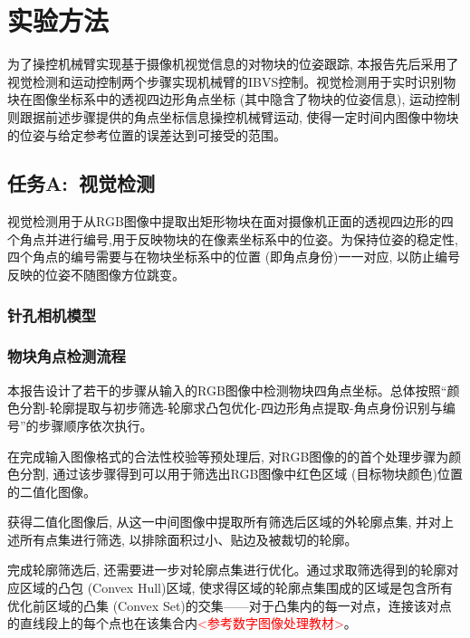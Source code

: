 
\chapter{实验方法}
\label{cha:Chapter2}
为了操控机械臂实现基于摄像机视觉信息的对物块的位姿跟踪, 本报告先后采用了视觉检测和运动控制两个步骤实现机械臂的IBVS控制。视觉检测用于实时识别物块在图像坐标系中的透视四边形角点坐标 (其中隐含了物块的位姿信息), 运动控制则跟据前述步骤提供的角点坐标信息操控机械臂运动, 使得一定时间内图像中物块的位姿与给定参考位置的误差达到可接受的范围。

\section{任务A:\ 视觉检测}
\label{sec:2_FeatureDetection}

视觉检测用于从RGB图像中提取出矩形物块在面对摄像机正面的透视四边形的四个角点并进行编号,用于反映物块的在像素坐标系中的位姿。为保持位姿的稳定性, 四个角点的编号需要与在物块坐标系中的位置 (即角点身份)一一对应, 以防止编号反映的位姿不随图像方位跳变。

\subsection{针孔相机模型}
\label{sec:2_CamModel}

\subsection{物块角点检测流程}
\label{sec:2_ProgramFlow}

本报告设计了若干的步骤从输入的RGB图像中检测物块四角点坐标。总体按照``颜色分割-轮廓提取与初步筛选-轮廓求凸包优化-四边形角点提取-角点身份识别与编号''的步骤顺序依次执行。

在完成输入图像格式的合法性校验等预处理后, 对RGB图像的的首个处理步骤为颜色分割, 通过该步骤得到可以用于筛选出RGB图像中红色区域 (目标物块颜色)位置的二值化图像。

获得二值化图像后, 从这一中间图像中提取所有筛选后区域的外轮廓点集, 并对上述所有点集进行筛选, 以排除面积过小、贴边及被裁切的轮廓。

完成轮廓筛选后, 还需要进一步对轮廓点集进行优化。通过求取筛选得到的轮廓对应区域的凸包 (Convex Hull)区域, 使求得区域的轮廓点集围成的区域是包含所有优化前区域的凸集 (Convex Set)的交集——对于凸集内的每一对点，连接该对点的直线段上的每个点也在该集合内\textcolor{red}{<参考数字图像处理教材>}。

